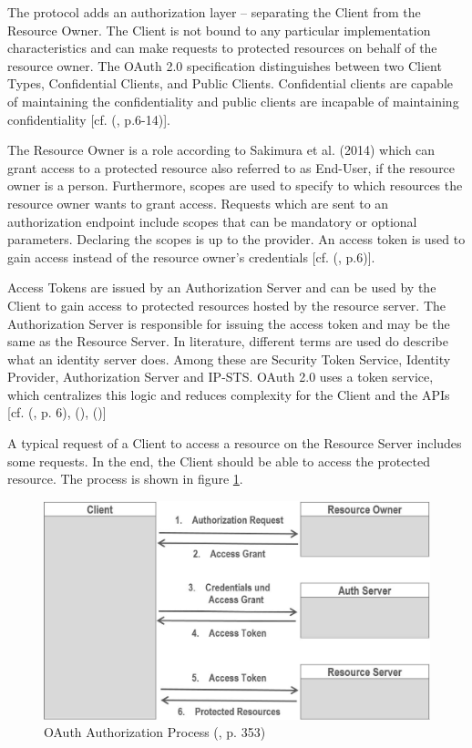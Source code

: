{{		The protocol adds an authorization layer – separating the Client from the Resource Owner. 
		The Client is not bound to any particular implementation characteristics and can make requests to protected resources on behalf of the resource owner. The OAuth 2.0 specification distinguishes between two Client Types, Confidential Clients, and Public Clients. Confidential clients are capable of maintaining the confidentiality and public clients are incapable of maintaining confidentiality [cf. (\cite{Hardt:2012:OAuth2}, p.6-14)].
		
		The Resource Owner is a role according to Sakimura et al. (2014) which can grant access to a protected resource also referred to as End-User, if the resource owner is a person. Furthermore, scopes are used to specify to which resources the resource owner wants to grant access. Requests which are sent to an authorization endpoint include scopes that can be mandatory or optional parameters. Declaring the scopes is up to the provider. An access token is used to gain access instead of the resource owner’s credentials [cf. (\cite{Sakimura:2014:OpenIDConnect}, p.6)]. 
		
		Access Tokens are issued by an Authorization Server and can be used by the Client to gain access to protected resources hosted by the resource server. The Authorization Server is responsible for issuing the access token and may be the same as the Resource Server. In literature, different terms are used do describe what an identity server does. Among these are Security Token Service, Identity Provider, Authorization Server and IP-STS. OAuth 2.0 uses a token service, which centralizes this logic and reduces complexity for the Client and the APIs [cf. (\cite{Sakimura:2014:OpenIDConnect}, p. 6), (\cite{Brock:2018:ID4}), (\cite{Boyd:2012:GSOAuth})]
		
		A typical request of a Client to access a resource on the Resource Server includes some requests. In the end, the Client should be able to access the protected resource. The process is shown in figure \ref{fig:oaut-process2}.
		
		\begin{figure}[h]
			\centering
			\includegraphics[width=0.8\linewidth]{images/oaut-process2}
			\caption{OAuth Authorization Process (\cite{LeBlanc:2011:SocialApplications}, p. 353)}
			\label{fig:oaut-process2}
		\end{figure}
		
}}
